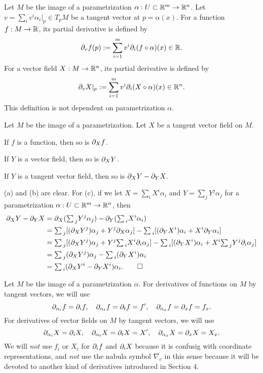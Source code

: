 \documentclass{../../large}
\renewcommand{\a}{\alpha}
\newcommand{\ssum}{{\textstyle\sum\,}}
\begin{document}
\begin{prb}
Let $M$ be the image of a parametrization $\a:U\subset\R^m\to\R^n$.
Let $v=\sum_iv^i\a_i|_p\in T_pM$ be a tangent vector at $p=\a(x)$.
For a function $f:M\to\mathbb{R}$, its partial derivative is defined by
\[\pd_vf(p):=\sum_{i=1}^mv^i\pd_i(f\circ\a)(x)\in\R.\]
For a vector field $X:M\to\mathbb{R}^n$, its partial derivative is defined by
\[\pd_vX|_p:=\sum_{i=1}^mv^i\pd_i(X\circ\a)(x)\in\R^n.\]
This definition is not dependent on parametrization $\a$.
\end{prb}

\begin{prb}
Let $M$ be the image of a parametrization.
Let $X$ be a tangent vector field on $M$.
\begin{parts}
\item If $f$ is a function, then so is $\pd_Xf$.
\item If $Y$ is a vector field, then so is $\pd_XY$.
\item If $Y$ is a tangent vector field, then so is $\pd_XY-\pd_YX$.
\end{parts}
\end{prb}
\begin{pf}
(a) and (b) are clear.
For (c), if we let $X=\sum_iX^i\a_i$ and $Y=\sum_jY^j\a_j$ for a parametrization $\a:U\subset\R^m\to\R^n$, then
\begin{align*}
\pd_XY-\pd_YX
&=\pd_X(\ssum_jY^j\a_j)-\pd_Y(\ssum_iX^i\a_i)\\
&=\ssum_j[(\pd_XY^j)\a_j+Y^j\pd_X\a_j]-\ssum_i[(\pd_YX^i)\a_i+X^i\pd_Y\a_i]\\
&=\ssum_j[(\pd_XY^j)\a_j+Y^j\ssum_iX^i\pd_i\a_j]-\ssum_i[(\pd_YX^i)\a_i+X^i\ssum_jY^j\pd_i\a_j]\\
&=\ssum_j(\pd_XY^j)\a_j-\ssum_i(\pd_YX^i)\a_i\\
&=\ssum_i(\pd_XY^i-\pd_YX^i)\a_i.\qedhere
\end{align*}
\end{pf}

\begin{prb}
Let $M$ be the image of a parametrization $\a$.
For derivatives of functions on $M$ by tangent vectors, we will use
\[\pd_{\a_i}f=\pd_if,\quad\pd_{\a_t}f=\pd_tf=f',\quad\pd_{\a_x}f=\pd_xf=f_x.\]
For derivatives of vector fields on $M$ by tangent vectors, we will use
\[\pd_{\a_i}X=\pd_iX,\quad\pd_{\a_t}X=\pd_tX=X',\quad\pd_{\a_x}X=\pd_xX=X_x.\]
We will \emph{not} use $f_i$ or $X_i$ for $\pd_if$ and $\pd_iX$ because it is confusig with coordinate representations, and \emph{not} use the nabula symbol $\nabla_v$ in this sense because it will be devoted to another kind of derivatives introduced in Section 4.
\end{prb}
\end{document}
